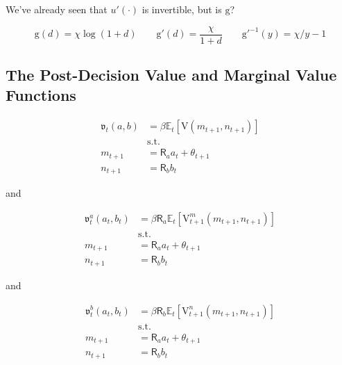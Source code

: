 \documentclass{article}
\newcommand{\DiscFac}{\beta}
\newcommand{\VFunc}{\mathrm{V}}
\newcommand{\util}{u}
\newcommand{\tShkEmp}{\theta}
\newcommand{\Ex}{\mathbb{E}}
\newcommand{\bRat}{b}
\newcommand{\Rfree}{\mathsf{R}}
\newcommand{\aRat}{a}
\newcommand{\mRat}{m}
\newcommand{\vEnd}{\mathfrak{v}}
\newcommand{\nRat}{n}
\newcommand{\dRat}{d}
\newcommand{\gFunc}{\mathrm{g}}
\newcommand{\xFer}{\chi}
\begin{document}
We've already seen that $\util'(\cdot)$ is invertible, but is $\gFunc$?

\begin{equation}
\gFunc(\dRat) = \xFer \log(1+\dRat) \qquad \gFunc'(\dRat) =
    \frac{\xFer}{1+\dRat} \qquad \gFunc'^{-1}(y) = \xFer/y - 1
\end{equation}

\subsection{The Post-Decision Value and Marginal Value Functions}\label{The Post-Decision Value and Marginal Value Functions}

\begin{equation}
\begin{split}
        \vEnd_{t}(\aRat, \bRat) & =  \DiscFac \Ex_{t} \left[
            \VFunc(\mRat_{t+1}, \nRat_{t+1}) \right] \\
        & \text{s.t.} \\
        \mRat_{t+1} & = \Rfree_{\aRat} \aRat_{t} + \tShkEmp_{t+1} \\
        \nRat_{t+1} & = \Rfree_{\bRat} \bRat_{t}
    \end{split}
\end{equation}

and

\begin{equation}
\begin{split}
        \vEnd_{t}^{\aRat}(\aRat_{t}, \bRat_{t}) & =  \DiscFac
        \Rfree_{\aRat} \Ex_{t} \left[ \VFunc^{\mRat}_{t+1}(\mRat_{t+1},
            \nRat_{t+1})
            \right] \\
        & \text{s.t.} \\
        \mRat_{t+1} & = \Rfree_{\aRat} \aRat_{t} + \tShkEmp_{t+1} \\
        \nRat_{t+1} & = \Rfree_{\bRat} \bRat_{t}
    \end{split}
\end{equation}

and

\begin{equation}
\begin{split}
        \vEnd_{t}^{\bRat}(\aRat_{t}, \bRat_{t}) & =  \DiscFac
        \Rfree_{\bRat} \Ex_{t} \left[ \VFunc^{\nRat}_{t+1}(\mRat_{t+1},
            \nRat_{t+1})
            \right] \\
        & \text{s.t.} \\
        \mRat_{t+1} & = \Rfree_{\aRat} \aRat_{t} + \tShkEmp_{t+1} \\
        \nRat_{t+1} & = \Rfree_{\bRat} \bRat_{t}
    \end{split}
\end{equation}
\end{document}
